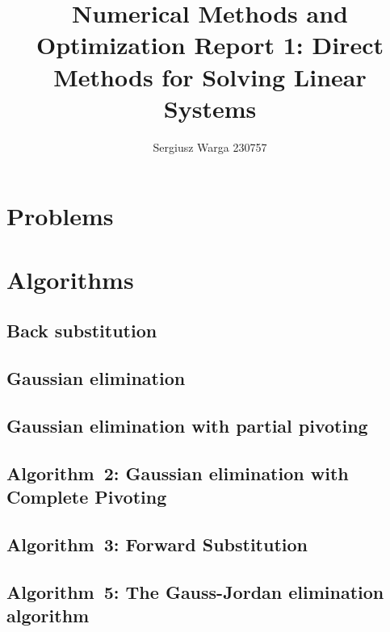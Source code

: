 \documentclass[a4paper]{article}
\title{Numerical Methods and Optimization Report 1:
  Direct Methods for Solving Linear Systems}
\author{Sergiusz Warga 230757}
\date{}
\begin{document}
\maketitle
\tableofcontents
\pagebreak

\section{Problems}









\clearpage

\section{Algorithms}
\subsection{Back substitution}%
\label{algorithm:back_substitution}

\subsection{Gaussian elimination}%
\label{algorithm:gaussian_elimination}

\subsection{Gaussian elimination with partial pivoting}
\label{algorithm:gaussian_elimination_with_partial_pivoting}
\subsection{Algorithm~2: Gaussian elimination with Complete Pivoting}%
\label{algorithm:2}

\subsection{Algorithm~3: Forward Substitution}%
\label{algorithm:3}

\subsection{Algorithm~5: The Gauss-Jordan elimination algorithm}%
\label{algorithm:5}

\end{document}
